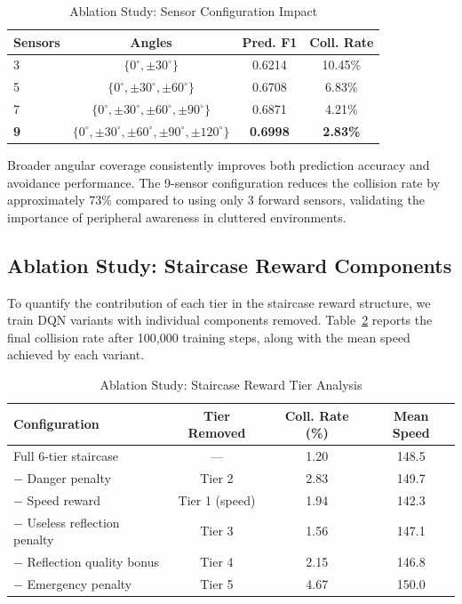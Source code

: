 \documentclass[conference]{IEEEtran}
\begin{document}
\begin{table}[H]
\centering
\caption{Ablation Study: Sensor Configuration Impact}
\label{tab:sensor_ablation}
\begin{tabular}{@{}lccc@{}}
\toprule
\textbf{Sensors} & \textbf{Angles} & \textbf{Pred. F1} & \textbf{Coll. Rate} \\
\midrule
3  & $\{0^\circ, \pm 30^\circ\}$    & 0.6214 & 10.45\% \\
5  & $\{0^\circ, \pm 30^\circ, \pm 60^\circ\}$ & 0.6708 & 6.83\% \\
7  & $\{0^\circ, \pm 30^\circ, \pm 60^\circ, \pm 90^\circ\}$ & 0.6871 & 4.21\% \\
\textbf{9} & $\{0^\circ, \pm 30^\circ, \pm 60^\circ, \pm 90^\circ, \pm 120^\circ\}$ & \textbf{0.6998} & \textbf{2.83\%} \\
\bottomrule
\end{tabular}
\end{table}

Broader angular coverage consistently improves both prediction accuracy and avoidance performance. The 9-sensor configuration reduces the collision rate by approximately 73\% compared to using only 3 forward sensors, validating the importance of peripheral awareness in cluttered environments.

\subsection{Ablation Study: Staircase Reward Components}

To quantify the contribution of each tier in the staircase reward structure, we train DQN variants with individual components removed. Table~\ref{tab:reward_ablation} reports the final collision rate after 100,000 training steps, along with the mean speed achieved by each variant.

\begin{table}[H]
\centering
\caption{Ablation Study: Staircase Reward Tier Analysis}
\label{tab:reward_ablation}
\begin{tabular}{@{}lccc@{}}
\toprule
\textbf{Configuration} & \textbf{Tier Removed} & \textbf{Coll. Rate (\%)} & \textbf{Mean Speed} \\
\midrule
Full 6-tier staircase   & ---   & 1.20 & 148.5 \\
$-$ Danger penalty      & Tier 2 & 2.83 & 149.7 \\
$-$ Speed reward        & Tier 1 (speed) & 1.94 & 142.3 \\
$-$ Useless reflection penalty & Tier 3 & 1.56 & 147.1 \\
$-$ Reflection quality bonus & Tier 4 & 2.15 & 146.8 \\
$-$ Emergency penalty   & Tier 5 & 4.67 & 150.0 \\
\bottomrule
\end{tabular}
\end{table}
\end{document}
